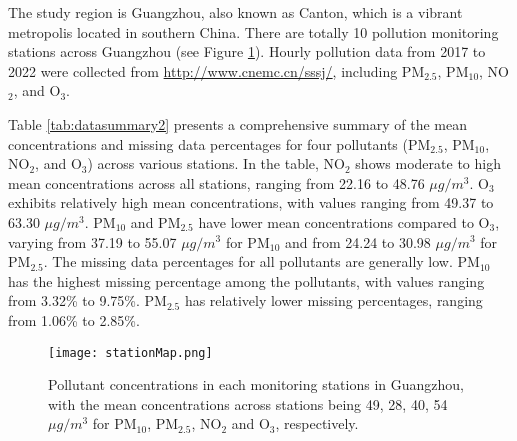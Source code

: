 \documentclass[
  12,
]{article}
\begin{document}
The study region is Guangzhou, also known as Canton, which is a vibrant
metropolis located in southern China. There are totally 10 pollution
monitoring stations across Guangzhou (see Figure \ref{fig:guangzhou}).
Hourly pollution data from 2017 to 2022 were collected from
\url{http://www.cnemc.cn/sssj/}, including PM\(_{2.5}\), PM\(_{10}\),
NO\(_2\), and O\(_3\).

Table \ref{tab:datasummary2} presents a comprehensive summary of the
mean concentrations and missing data percentages for four pollutants
(PM\(_{2.5}\), PM\(_{10}\), NO\(_2\), and O\(_3\)) across various
stations. In the table, NO\(_2\) shows moderate to high mean
concentrations across all stations, ranging from 22.16 to 48.76
\(\mu g/m^{3}\). O\(_3\) exhibits relatively high mean concentrations,
with values ranging from 49.37 to 63.30 \(\mu g/m^{3}\). PM\(_{10}\) and
PM\(_{2.5}\) have lower mean concentrations compared to O\(_3\), varying
from 37.19 to 55.07 \(\mu g/m^{3}\) for PM\(_{10}\) and from 24.24 to
30.98 \(\mu g/m^{3}\) for PM\(_{2.5}\). The missing data percentages for
all pollutants are generally low. PM\(_{10}\) has the highest missing
percentage among the pollutants, with values ranging from 3.32\% to
9.75\%. PM\(_{2.5}\) has relatively lower missing percentages, ranging
from 1.06\% to 2.85\%.

\begin{figure}
  \centering
  \texttt{[image: stationMap.png]}
  \caption{Pollutant concentrations in each monitoring stations in Guangzhou, with the mean concentrations across stations being 49, 28, 40, 54 $\mu g/m^{3}$ for PM$_{10}$, PM$_{2.5}$, NO$_2$ and O$_3$, respectively.}
  \label{fig:guangzhou} 
\end{figure}
\end{document}
